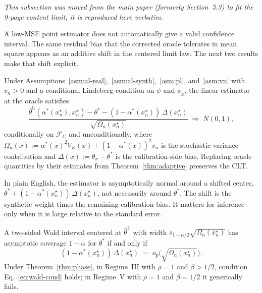 \label{app:wald}

\emph{This subsection was moved from the main paper (formerly Section~5.3) to fit the 9-page content limit; it is reproduced here verbatim.}

A low-MSE point estimator does not automatically give a valid confidence interval. The same residual bias that the corrected oracle tolerates in mean square appears as an additive shift in the centered limit law. The next two results make that shift explicit.

\begin{proposition}\label{prop:clt}
Under Assumptions~\ref{asm:al-real},~\ref{asm:al-synth},~\ref{asm:pl}, and~\ref{asm:vn} with $v_n>0$ and a conditional Lindeberg condition on $\psi$ and $\phi_x$, the linear estimator at the oracle satisfies
\begin{equation}\label{eq:clt}
  \frac{\hat\theta^{\mathrm{L}}(\alpha^*(x_n^\star),x_n^\star)-\theta^*-(1-\alpha^*(x_n^\star))\,\Delta(x_n^\star)}{\sqrt{\Omega_n(x_n^\star)}}\;\Rightarrow\;N(0,1),
\end{equation}
conditionally on $\mathcal{F}_C$ and unconditionally, where $\Omega_n(x):=\alpha^*(x)^2 V_R(x)+(1-\alpha^*(x))^2 v_n$ is the stochastic-variance contribution and $\Delta(x):=\theta_x-\theta^*$ is the calibration-side bias. Replacing oracle quantities by their estimates from Theorem~\ref{thm:adaptive} preserves the CLT.
\end{proposition}

In plain English, the estimator is asymptotically normal around a shifted center, $\theta^*+(1-\alpha^*(x_n^\star))\,\Delta(x_n^\star)$, not necessarily around $\theta^*$. The shift is the synthetic weight times the remaining calibration bias. It matters for inference only when it is large relative to the standard error.

\begin{corollary}\label{cor:wald}
A two-sided Wald interval centered at $\hat\theta^{\mathrm{L}}$ with width $z_{1-\alpha/2}\sqrt{\Omega_n(x_n^\star)}$ has asymptotic coverage $1-\alpha$ for $\theta^*$ if and only if
\begin{equation}\label{eq:wald-cond}
  (1-\alpha^*(x_n^\star))\,\Delta(x_n^\star)\;=\;o_p\bigl(\sqrt{\Omega_n(x_n^\star)}\bigr).
\end{equation}
Under Theorem~\ref{thm:phase}, in Regime~III with $\rho=1$ and $\beta>1/2$, condition Eq.~\ref{eq:wald-cond} holds; in Regime~V with $\rho=1$ and $\beta=1/2$ it generically fails.
\end{corollary}

